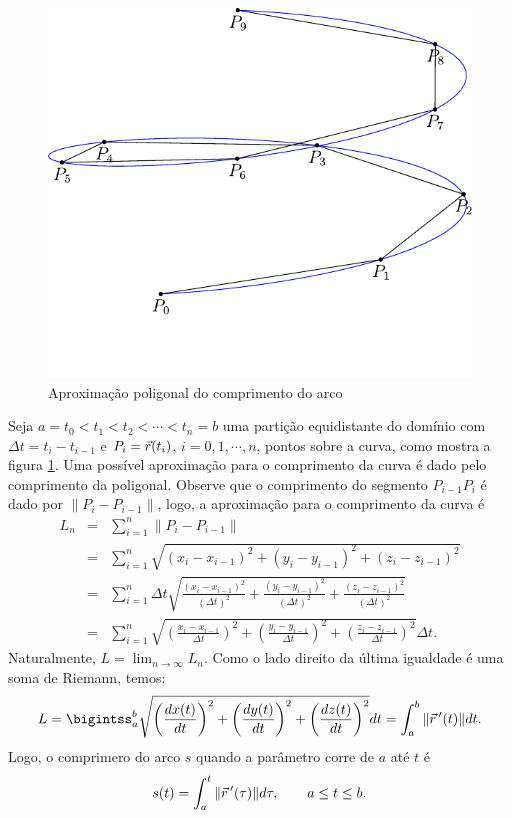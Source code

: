  
 \begin{figure}%
\begin{center}
    \includegraphics{./cap_curvas/pics/helice_retificacao}
\caption{Aproximação poligonal do comprimento do arco}\label{fig_compr_arc}
  \end{center}
\end{figure}

 
 
Seja $a=t_0<t_1<t_2<\cdots<t_n=b $ uma partição equidistante do domínio com $\Delta t=t_i-t_{i-1}$ e $P_i=\vec{r}(t_i)$, $i=0,1,\cdots,n$, pontos sobre a curva, como mostra a figura \ref{fig_compr_arc}. Uma possível aproximação para o comprimento da curva é dado pelo comprimento da poligonal. Observe que o comprimento do segmento $P_{i-1}P_i$ é dado por $\|P_i-P_{i-1}\|$, logo, a aproximação para o comprimento da curva é
\begin{eqnarray*}
L_n&=&\sum_{i=1}^n\|P_i-P_{i-1}\|\\
&=&\sum_{i=1}^n \sqrt{(x_i-x_{i-1})^2+(y_i-y_{i-1})^2+(z_i-z_{i-1})^2}\\
&=&\sum_{i=1}^n \Delta t \sqrt{\frac{(x_i-x_{i-1})^2}{(\Delta t) ^2}+\frac{(y_i-y_{i-1})^2}{(\Delta t) ^2}+\frac{(z_i-z_{i-1})^2}{(\Delta t) ^2}}\\
&=&\sum_{i=1}^n \sqrt{\left(\frac{x_i-x_{i-1}}{\Delta t }\right)^2+\left(\frac{y_i-y_{i-1}}{\Delta t}\right)^2+\left(\frac{z_i-z_{i-1}}{\Delta t}\right)^2}\Delta t.
\end{eqnarray*}
Naturalmente, $L=\lim_{n\to\infty }L_n$. Como o lado direito da última igualdade é uma soma de Riemann, temos:
\begin{equation}\label{defcomparco}
L=\bigintss_{a}^{b} \sqrt{\left(\frac{dx(t)}{dt}\right)^2+\left(\frac{dy(t)}{dt}\right)^2+\left(\frac{dz(t)}{dt}\right)^2}dt=\int_{a}^{b}\|\vct{r}\!~'(t)\|dt.
\end{equation}
Logo, o comprimero do arco $s$ quando a parâmetro corre de $a$ até $t$ é
\begin{equation}\label{defcomparco_1}
s(t)=\int_{a}^{t}\|\vec{r}\!~'(\tau)\|d\tau,\qquad a\leq t\leq b.
\end{equation}


